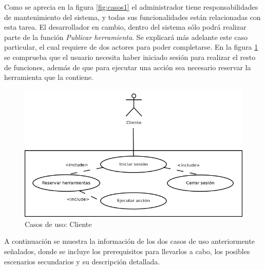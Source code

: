 Como se aprecia en la figura \ref{fig:casos1} el administrador tiene 
responsabilidades de mantenimiento del sistema, y todas sus 
funcionalidades están relacionadas con esta tarea. El desarrollador en 
cambio, dentro del sistema sólo podrá realizar parte de la función 
\emph{Publicar herramienta}. Se explicará más adelante este caso 
particular, el cual requiere de dos actores para poder completarse. En 
la figura \ref{fig:casos2} se comprueba que el usuario necesita haber 
iniciado sesión para realizar el resto de funciones, además de que 
para ejecutar una acción sea necesario reservar la herramienta que la 
contiene.

\begin{figure}[h]
	\centering
	\includegraphics[scale=0.6]{images/casos2.png}
	\caption{Casos de uso: Cliente}
	\label{fig:casos2}
\end{figure}

A continuación se muestra la información de los dos casos de uso 
anteriormente señalados, donde se incluye los prerequisitos para 
llevarlos a cabo, los posibles escenarios secundarios y su descripción 
detallada.


